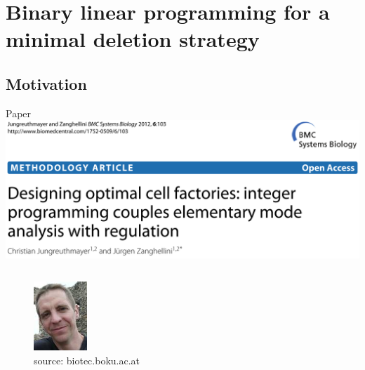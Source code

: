 \documentclass{beamer}
\begin{document}
\section{Binary linear programming for a minimal deletion strategy}
\subsection{Motivation}

\begin{frame}{Paper}
    \includegraphics[width=1\textwidth]{grafik/paper}
    \begin{columns}
      \begin{center}
        \begin{figure}
         \includegraphics[width=0.5\textwidth]{grafik/jungreuthmayer} \\
         \tiny{source: biotec.boku.ac.at}
        \end{figure}
      \end{center}

\end{columns}
\end{frame}
\end{document}
